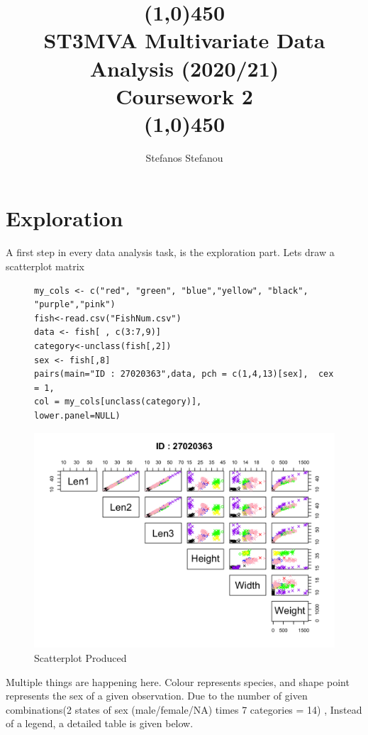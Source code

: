 \documentclass[openany]{article}
\title{\line(1,0){450}\\ ST3MVA Multivariate Data Analysis (2020/21) \\ \large Coursework 2  \\\line(1,0){450} \\ }
\author{Stefanos Stefanou}
\begin{document}
	\section{Exploration}
		A first step in every data analysis task, is the exploration part. Lets draw a scatterplot matrix
		\begin{figure}[H]
			\iftrue
			\begin{lstlisting}[style=myScalastyle]
my_cols <- c("red", "green", "blue","yellow", "black", "purple","pink") 
fish<-read.csv("FishNum.csv")
data <- fish[ , c(3:7,9)]
category<-unclass(fish[,2])
sex <- fish[,8]
pairs(main="ID : 27020363",data, pch = c(1,4,13)[sex],  cex = 1,
col = my_cols[unclass(category)],
lower.panel=NULL)
			\end{lstlisting}
			\fi
		\end{figure}
		\begin{figure}[H]
			\iftrue
			\caption{Scatterplot Produced}
			\centering
			\includegraphics[scale=0.4]{res/matrixscatter}
			\fi
		\end{figure}
		Multiple things are happening here. Colour represents species, and shape point represents the sex of a given observation. Due to the number of given
		combinations(2 states of sex (male/female/NA) times 7 categories = 14) , Instead of a legend, a detailed table is given below.
\end{document}
